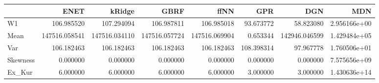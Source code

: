 \begin{tabular}{lrrrrrrr}
\toprule
{} &           ENET &         kRidge &           GBRF &           ffNN &         GPR &            DGN &           MDN \\
\midrule
W1       &     106.985520 &     107.294094 &     106.987811 &     106.985018 &   93.673772 &      58.823080 &  2.956166e+00 \\
Mean     &  147516.058541 &  147516.034110 &  147516.057724 &  147516.069904 &    0.653344 &  142946.046599 &  1.429484e+05 \\
Var      &     106.182463 &     106.182463 &     106.182463 &     106.182463 &  108.398314 &      97.967778 &  1.760506e+01 \\
Skewness &       0.000000 &       0.000000 &       0.000000 &       0.000000 &    0.000000 &       0.000000 &  7.575656e+09 \\
Ex\_Kur   &       6.000000 &       6.000000 &       6.000000 &       6.000000 &    3.000000 &       3.000000 &  1.430636e+14 \\
\bottomrule
\end{tabular}
